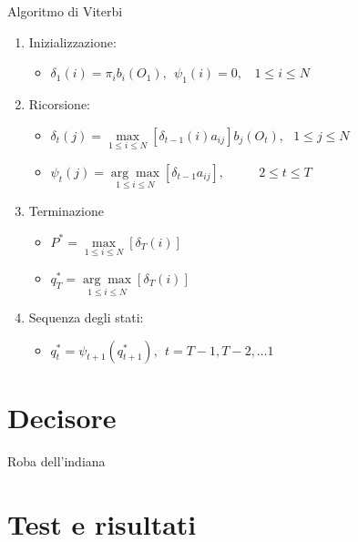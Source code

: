\documentclass[slidestop,mathserif,red]{beamer}
\begin{document}
\begin{frame}
\begin{block}{Algoritmo di Viterbi}
\begin{enumerate}
\item Inizializzazione:
	\begin{itemize}
 	\item $\delta_{1}(i)=\pi_{i}b_{i}(O_{1}),\ \ \psi_{1}(i)=0,\ \ \ \ 1\leq i \leq N$  
	\end{itemize}
\item Ricorsione:
	\begin{itemize}
 	\item $\delta_{t}(j)=\underset{1\leq i \leq N}{\max}[\delta_{t-1}(i)a_{ij}]b_{j}(O_{t}),\ \ \ 1\leq j \leq N$
	\item $\psi_{t}(j)=\underset{1\leq i \leq N}{\arg\max}[\delta_{t-1}a_{ij}],\ \ \ \ \ \ \ \ \ \ \ \ 2\leq t \leq T$
	\end{itemize}
\item Terminazione
	\begin{itemize}
 	\item $P^*=\underset{1\leq i \leq N}{\max}[\delta_{T}(i)]$
	\item $q_{T}^*=\underset{1\leq i \leq N}{\arg\max}[\delta_{T}(i)]$
	\end{itemize}
\item Sequenza degli stati:
	\begin{itemize}
 	\item $q_{t}^*=\psi_{t+1}(q_{t+1}^*),\ \ t = T-1,T-2,\ldots1$
	\end{itemize}
\end{enumerate}

\end{block}
\end{frame}


\section{Decisore}

\begin{frame}{Roba dell'indiana}
\begin{block}{}

\end{block}
\end{frame}

\section{Test e risultati}
\end{document}
